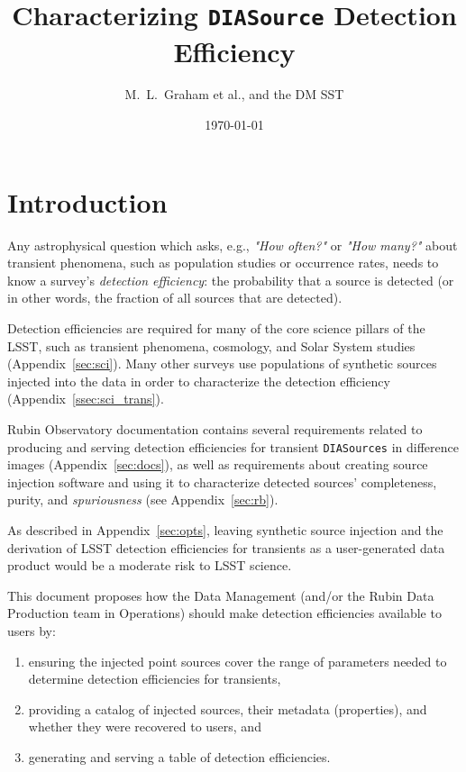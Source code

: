 \documentclass[DM,lsstdraft,toc]{lsstdoc}
\title[Detection Efficiencies]{Characterizing {\tt DIASource} Detection Efficiency}
\author{M.~L.~Graham et al., and the DM SST}
\date{\today}
\begin{document}
\maketitle



\section{Introduction} \label{sec:intro}

Any astrophysical question which asks, e.g., {\it "How often?"} or {\it "How many?"} about transient phenomena, such as population studies or occurrence rates, needs to know a survey's {\it detection efficiency}: the probability that a source is detected (or in other words, the fraction of all sources that are detected).

Detection efficiencies are required for many of the core science pillars of the LSST, such as transient phenomena, cosmology, and Solar System studies  (Appendix~\ref{sec:sci}).
Many other surveys use populations of synthetic sources injected into the data in order to characterize the detection efficiency (Appendix~\ref{ssec:sci_trans}).

Rubin Observatory documentation contains several requirements related to producing and serving detection efficiencies for transient {\tt DIASources} in difference images (Appendix~\ref{sec:docs}), as well as requirements about creating source injection software and using it to characterize detected sources' completeness, purity, and {\it spuriousness} (see Appendix~\ref{sec:rb}).

As described in Appendix~\ref{sec:opts}, leaving synthetic source injection and the derivation of LSST detection efficiencies for transients as a user-generated data product would be a moderate risk to LSST science.

This document proposes how the Data Management (and/or the Rubin Data Production team in Operations) should make detection efficiencies available to users by:

\begin{enumerate}
\item ensuring the injected point sources cover the range of parameters needed to determine detection efficiencies for transients,
\item providing a catalog of injected sources, their metadata (properties), and whether they were recovered to users, and
\item generating and serving a table of detection efficiencies.
\end{enumerate}
\end{document}
